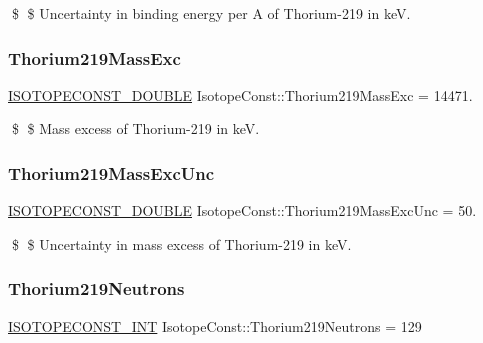 \$ \$ Uncertainty in binding energy per A of Thorium-\/219 in keV. \mbox{\label{group___isotope_const-_thorium-_th219_gad269470df2d5c5eb9ec91dffd3303e85}} 
\subsubsection{\texorpdfstring{Thorium219\+Mass\+Exc}{Thorium219MassExc}}
{\footnotesize\ttfamily \mbox{\hyperlink{group___isotope_const-_macros_ga8f45a7272ce02c0b4c65c44636ed719a}{I\+S\+O\+T\+O\+P\+E\+C\+O\+N\+S\+T\+\_\+\+D\+O\+U\+B\+LE}} Isotope\+Const\+::\+Thorium219\+Mass\+Exc = 14471.}

\$ \$ Mass excess of Thorium-\/219 in keV. \mbox{\label{group___isotope_const-_thorium-_th219_gaa154d8161046a7da5b82a62d0b8c5448}} 
\subsubsection{\texorpdfstring{Thorium219\+Mass\+Exc\+Unc}{Thorium219MassExcUnc}}
{\footnotesize\ttfamily \mbox{\hyperlink{group___isotope_const-_macros_ga8f45a7272ce02c0b4c65c44636ed719a}{I\+S\+O\+T\+O\+P\+E\+C\+O\+N\+S\+T\+\_\+\+D\+O\+U\+B\+LE}} Isotope\+Const\+::\+Thorium219\+Mass\+Exc\+Unc = 50.}

\$ \$ Uncertainty in mass excess of Thorium-\/219 in keV. \mbox{\label{group___isotope_const-_thorium-_th219_ga2ca6a370686ab643d13213b1f60a7f31}} 
\subsubsection{\texorpdfstring{Thorium219\+Neutrons}{Thorium219Neutrons}}
{\footnotesize\ttfamily \mbox{\hyperlink{group___isotope_const-_macros_ga5f18360b3e99483a35c32d789e62621c}{I\+S\+O\+T\+O\+P\+E\+C\+O\+N\+S\+T\+\_\+\+I\+NT}} Isotope\+Const\+::\+Thorium219\+Neutrons = 129}

